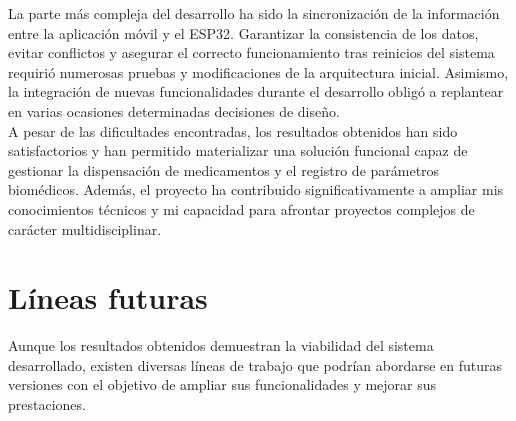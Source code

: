 La parte más compleja del desarrollo ha sido la sincronización de la información entre la aplicación móvil y el ESP32. Garantizar la consistencia de los datos, evitar conflictos y asegurar el correcto funcionamiento tras reinicios del sistema requirió numerosas pruebas y modificaciones de la arquitectura inicial. Asimismo, la integración de nuevas funcionalidades durante el desarrollo obligó a replantear en varias ocasiones determinadas decisiones de diseño.\\

A pesar de las dificultades encontradas, los resultados obtenidos han sido satisfactorios y han permitido materializar una solución funcional capaz de gestionar la dispensación de medicamentos y el registro de parámetros biomédicos. Además, el proyecto ha contribuido significativamente a ampliar mis conocimientos técnicos y mi capacidad para afrontar proyectos complejos de carácter multidisciplinar.

\section{Líneas futuras}

Aunque los resultados obtenidos demuestran la viabilidad del sistema desarrollado, existen diversas líneas de trabajo que podrían abordarse en futuras versiones con el objetivo de ampliar sus funcionalidades y mejorar sus prestaciones.

